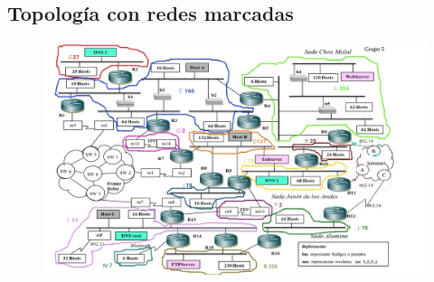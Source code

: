 \documentclass[12pt, a4paper, spanish]{article}
\begin{document}
\subsection{Topología con redes marcadas}
\begin{figure}[h!]
	\centering
	\includegraphics[scale=0.85,angle=90]{diagramas/topologia_marcada.jpg} \\
\end{figure}

\end{document}
